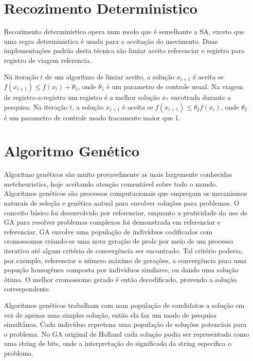 \documentclass[a4paper, 12pt]{article}
\begin{document}
\section{Recozimento Deterministico}

 Recozimento deterministico opera num modo que é semelhante a SA, exceto que uma regra
deterministica é usada para a aceitação do movimento. Duas implementações padrão desta técnica são
limiar aceito {\color{red} referenciar} e registro para registro de viagem {\color{red} referencia}.

 Ná iteração $t$ de um algoritmo de limiar aceito, a solução $x_{i+1}$ é aceita se $f(x_{i+1}) \leq
f(x_i)+\theta_1$, onde $\theta_1$ é um parametro de controle usual. Na viagem de registro-a-registro
um registro é a melhor solução $x_*$ encotrada durante a pesquisa. Na iteração $t$, a solução
$x_{i+1}$ é aceita se $f(x_{i+1}) \leq \theta_2 f(x_i)$, onde $\theta_2$ é um parametro de controle
usado fracamente maior que 1.

\section{Algoritmo Genético}

 Algoritmo genéticos são muito provavelmente as mais largemente conhecidas meteheuristics, hoje
aceitando atenção comentável sobre todo o mundo. Algoritmos genéticos são processos computacionais
que empregam os mecanismos naturais de seleção e genética natual para envolver soluções para
problemas. O conceito básico foi desenvolvido por {\color{red} referenciar}, enquanto a praticidade
do uso de GA para resolver problemas complexos foi demonstrada em {\color{red} referenciar} e
{\color{red} referenciar}. GA envolve uma população de indivíduos codificados com cromossomos
criando-se uma nova geração de prole por meio de um processo iterativo até algum critério de
convergência ser encontrado. Tal critério poderia, por exemplo, referenciar o número máximo de
gerações, a convergência para uma popução homogênea composta por indivíduos similares, ou dando uma
solução ótima. O melhor cromossomo gerado é então decodificado, provendo a solução correspondente.

 Algoritmos genéticos trabalham com uam população de candidatos a solução em vez de apenas uma
simples solução, então ela faz um modo de pesquisa simultânea. Cada indivíduo repretena uma
população de soluções potenciais para o problema. No GA original de Holland cada solução podia ser
representada como uma string de bits, onde a interpretação do significado da string especifica o
problema.
\end{document}

